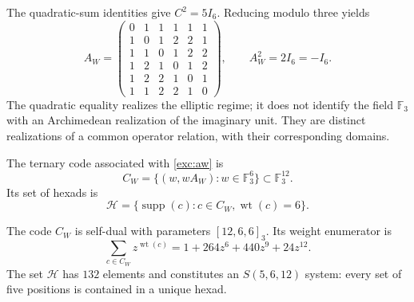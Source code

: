 

The quadratic-sum identities give $C^2=5I_6$. Reducing modulo
three yields
\begin{equation}
 A_W=
 \begin{pmatrix}
 0&1&1&1&1&1\\
 1&0&1&2&2&1\\
 1&1&0&1&2&2\\
 1&2&1&0&1&2\\
 1&2&2&1&0&1\\
 1&1&2&2&1&0
 \end{pmatrix},
 \qquad A_W^2=2I_6=-I_6.
 \label{exc:aw}
\end{equation}
The quadratic equality realizes the elliptic regime; it does not identify the
field $\mathbb F_3$ with an Archimedean realization of the imaginary
unit. They are distinct realizations of a common operator
relation, with their corresponding domains.



\begin{definition}
\label{exc:codigo}
The ternary code associated with \eqref{exc:aw} is
\[
 C_W=\{(w,wA_W):w\in\mathbb F_3^6\}
       \subset\mathbb F_3^{12}.
\]
Its set of hexads is
\[
 \mathcal H=
 \{\operatorname{supp}(c):c\in C_W,
                           \operatorname{wt}(c)=6\}.
\]
\end{definition}

\begin{proposition}
\label{exc:codigo-witt}
The code $C_W$ is self-dual with parameters $[12,6,6]_3$. Its weight
enumerator is
\begin{equation}
 \sum_{c\in C_W}z^{\operatorname{wt}(c)}
   =1+264z^6+440z^9+24z^{12}.
 \label{exc:enumerador}
\end{equation}
The set $\mathcal H$ has $132$ elements and constitutes an
$S(5,6,12)$ system: every set of five positions is contained in a
unique hexad.
\end{proposition}

